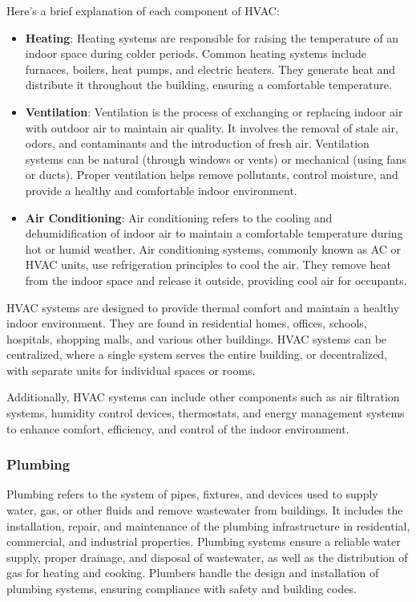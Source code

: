 \documentclass{article}
\begin{document}
Here's a brief explanation of each component of HVAC:
\begin{itemize}
  \item \textbf{Heating}: Heating systems are responsible for raising the temperature of an indoor space during colder periods. Common heating systems include furnaces, boilers, heat pumps, and electric heaters. They generate heat and distribute it throughout the building, ensuring a comfortable temperature.
  \item \textbf{Ventilation}: Ventilation is the process of exchanging or replacing indoor air with outdoor air to maintain air quality. It involves the removal of stale air, odors, and contaminants and the introduction of fresh air. Ventilation systems can be natural (through windows or vents) or mechanical (using fans or ducts). Proper ventilation helps remove pollutants, control moisture, and provide a healthy and comfortable indoor environment.
  \item \textbf{Air Conditioning}: Air conditioning refers to the cooling and dehumidification of indoor air to maintain a comfortable temperature during hot or humid weather. Air conditioning systems, commonly known as AC or HVAC units, use refrigeration principles to cool the air. They remove heat from the indoor space and release it outside, providing cool air for occupants.

\end{itemize}

HVAC systems are designed to provide thermal comfort and maintain a healthy indoor environment. They are found in residential homes, offices, schools, hospitals, shopping malls, and various other buildings. HVAC systems can be centralized, where a single system serves the entire building, or decentralized, with separate units for individual spaces or rooms.

Additionally, HVAC systems can include other components such as air filtration systems, humidity control devices, thermostats, and energy management systems to enhance comfort, efficiency, and control of the indoor environment.

\subsubsection*{Plumbing}
Plumbing refers to the system of pipes, fixtures, and devices used to supply water, gas, or other fluids and remove wastewater from buildings. It includes the installation, repair, and maintenance of the plumbing infrastructure in residential, commercial, and industrial properties. Plumbing systems ensure a reliable water supply, proper drainage, and disposal of wastewater, as well as the distribution of gas for heating and cooking. Plumbers handle the design and installation of plumbing systems, ensuring compliance with safety and building codes.
\end{document}
